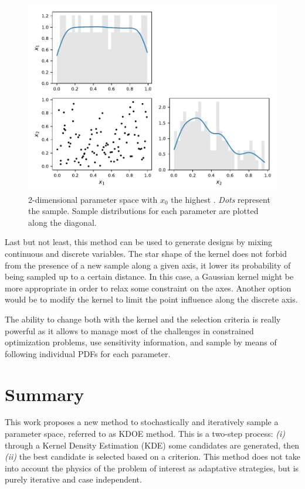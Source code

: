 \begin{figure}[!ht]
\centering
\includegraphics[width=0.9\linewidth,keepaspectratio]{fig/contributions/doe/kde_sensitivity.pdf}
\caption{2-dimensional parameter space with $x_0$ the highest . \emph{Dots} represent the sample. Sample distributions for each parameter are plotted along the diagonal.}
\label{fig:sensitivity}
\end{figure}

Last but not least, this method can be used to generate designs by mixing continuous and discrete variables. The star shape of the kernel does not forbid from the presence of a new sample along a given axis, it lower its probability of being sampled up to a certain distance. In this case, a Gaussian kernel might be more appropriate in order to relax some constraint on the axes. Another option would be to modify the kernel to limit the point influence along the discrete axis.

The ability to change both with the kernel and the selection criteria is really powerful as it allows to manage most of the challenges in constrained optimization problems, use sensitivity information, and sample by means of following individual PDFs for each parameter.

\section{Summary}%

This work proposes a new method to stochastically and iteratively sample a parameter space, referred to as KDOE method. This is a two-step process: \emph{(i)} through a Kernel Density Estimation (KDE) some candidates are generated, then \emph{(ii)} the best candidate is selected based on a criterion. This method does not take into account the physics of the problem of interest as adaptative strategies, but is purely iterative and case independent.

